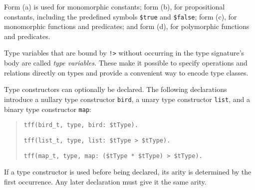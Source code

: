 Form (a) is used for monomorphic constants; form (b), for
propositional constants, including the predefined symbols {\tt \$true} and
{\tt \$false}; form (c), for monomorphic functions and predicates;
and form (d), for polymorphic functions and predicates.



Type variables that are bound by {\tt !>} without
occurring in the type signature's body are called \emph{\theghost{} type variables.}
These make it possible to specify operations and relations directly on types and
provide a convenient way to encode type classes.


 Type constructors
can optionally be declared.
The following declarations introduce a nullary type
constructor {\tt bird}, a unary type constructor {\tt list},
and a binary type constructor {\tt map}:
\begin{quote}
\verb+tff(bird_t, type, bird: $tType).+
\par
\verb+tff(list_t, type, list: $tType > $tType).+
\par
\verb+tff(map_t, type, map: ($tType * $tType) > $tType).+
\end{quote}
If a type constructor is used before being declared, its arity is
determined by the first occurrence. Any later declaration
must give it the same arity.

